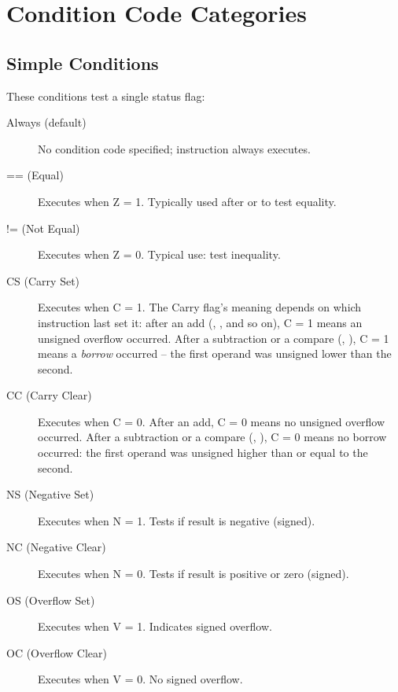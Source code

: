 \section{Condition Code Categories}

\subsection{Simple Conditions}

These conditions test a single status flag:

\begin{description}
	\item[Always (default)] No condition code specified; instruction always executes.

	\item[== (Equal)] Executes when Z = 1. Typically used after  or  to test equality.

	\item[!= (Not Equal)] Executes when Z = 0. Typical use: test inequality.

	\item[CS (Carry Set)] Executes when C = 1. The Carry flag's meaning depends on which instruction last set it: after an add
	      (, , and so on), C = 1 means an unsigned overflow occurred. After a subtraction or a
	      compare (, ), C = 1 means a \emph{borrow} occurred -- the first operand was unsigned
	      lower than the second.

	\item[CC (Carry Clear)] Executes when C = 0. After an add, C = 0 means no unsigned overflow occurred. After a subtraction or
	      a compare (, ), C = 0 means no borrow occurred: the first operand was unsigned higher
	      than or equal to the second.

	\item[NS (Negative Set)] Executes when N = 1. Tests if result is negative (signed).

	\item[NC (Negative Clear)] Executes when N = 0. Tests if result is positive or zero (signed).

	\item[OS (Overflow Set)] Executes when V = 1. Indicates signed overflow.

	\item[OC (Overflow Clear)] Executes when V = 0. No signed overflow.
\end{description}

